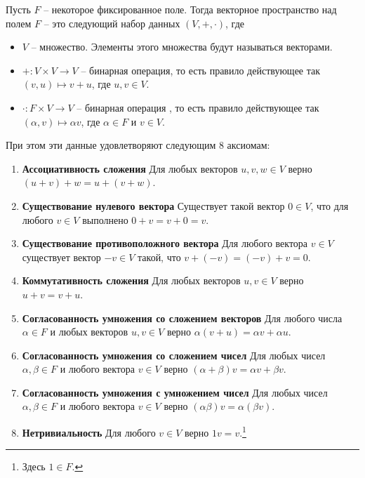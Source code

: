\begin{definition}\label{def::VectorSpace}
Пусть $F$ -- некоторое фиксированное поле. Тогда векторное пространство над полем $F$ -- это следующий набор данных $(V, +, \cdot)$, где
\begin{itemize}
\item $V$ -- множество. Элементы этого множества будут называться векторами.
\item $+\colon V \times V \to V$ -- бинарная операция, то есть правило действующее так $(v,u)\mapsto v + u$, где $u,v \in V$. 
\item $\cdot \colon F \times V \to V$ -- бинарная операция , то есть правило действующее так $(\alpha, v)\mapsto \alpha v$, где $\alpha \in F$ и $v\in V$.
\end{itemize}
При этом эти данные удовлетворяют следующим $8$ аксиомам:
\begin{enumerate}

\item {\bf Ассоциативность сложения} Для любых векторов $u,v,w\in V$ верно $(u+v) + w = u + (v+w)$.

\item {\bf Существование нулевого вектора} Существует такой вектор $0\in V$, что для любого $v\in V$ выполнено $0 + v = v + 0 = v$.

\item {\bf Существование противоположного вектора} Для любого вектора $v\in V$ существует вектор $-v\in V$ такой, что $v + (-v) = (-v) + v = 0$.

\item {\bf Коммутативность сложения} Для любых векторов $u,v \in V$ верно $u + v = v + u$.

\item {\bf Согласованность умножения со сложением векторов} Для любого числа $\alpha \in F$ и любых векторов $u,v \in V$ верно $\alpha(v + u) = \alpha v + \alpha u$.

\item {\bf Согласованность умножения со сложением чисел} Для любых чисел $\alpha, \beta\in F$ и любого вектора $v\in V$ верно $(\alpha + \beta)v = \alpha v + \beta v$.

\item {\bf Согласованность умножения с умножением чисел} Для любых чисел $\alpha,\beta\in F$ и любого вектора $v\in V$ верно $(\alpha\beta)v = \alpha(\beta v)$.

\item {\bf Нетривиальность} Для любого $v\in V$ верно $1 v = v$.\footnote{Здесь $1\in F$.}
\end{enumerate}
\end{definition}

